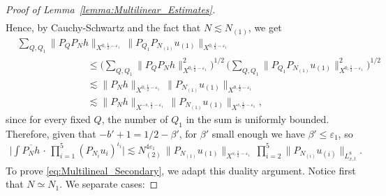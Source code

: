 \documentclass[10pt,a4paper]{amsart}
\begin{document}
\begin{proof}[Proof of Lemma~\ref{lemma:Multilinear_Estimates}]
\begin{align}
    \end{align}
Hence, by Cauchy-Schwartz and the fact that $N \lesssim N_{(1)}$, we get  
    \begin{align}\label{eq:Multilinear_Proof_Box_Localization}
        & \sum_{Q, Q_1} \lVert P_Q P_N  h \rVert_{X^{0, \frac{1}{2} - \varepsilon_1}} \, 
        \big\lVert  P_{Q_1} P_{N_{(1)}} u_{(1)} \big\rVert_{X^{0, \frac{1}{2} - \varepsilon_1}} \nonumber \\
        & \hspace{3cm}
        \leq 
        \Big( \sum_{Q, Q_1 } \lVert P_Q P_N  h \rVert_{X^{0, \frac{1}{2} - \varepsilon_1}}^2
        \Big)^{1/2}
        \, 
        \Big( \sum_{Q, Q_1} \lVert P_{Q_1} P_{N_{(1)}}  u_{(1)} \rVert_{X^{0, \frac{1}{2} - \varepsilon_1}}^2
        \Big)^{1/2} \nonumber \\
        & \hspace{3cm}
        \lesssim 
        \lVert P_N  h \rVert_{X^{0, \frac{1}{2} - \varepsilon_1}} \, 
        \lVert P_{N_{(1)}}  u_{(1)} \rVert_{X^{0, \frac{1}{2} - \varepsilon_1}} \nonumber \\
        & \hspace{3cm}
        \lesssim 
        \lVert P_N  h \rVert_{X^{-s, \frac{1}{2} - \varepsilon_1}} \, 
        \lVert P_{N_{(1)}}  u_{(1)} \rVert_{X^{s, \frac{1}{2} - \varepsilon_1}}, 
    \end{align}
    since for every fixed $Q$, the number of $Q_1$ in the sum is uniformly bounded. 
    Therefore, given that $-b' + 1 = 1/2 - \beta'$, for $\beta'$ small enough we have $\beta' \leq \varepsilon_1$, so
    \begin{align}
        \Big|\int \overline{P_N h} \, \cdot \, \prod_{i=1}^5 
        (P_{N_i} u_i)^{\iota_i} \Big|
        \lesssim
        N_{(2)}^{4\varepsilon_1} \,  
        \lVert P_{N_{(1)}}  u_{(1)} \rVert_{X^{s, \frac{1}{2} - \varepsilon_1}} \, 
        \prod_{i=2}^5 \big\lVert  P_{N_{(i)}} u_{(i)} \big\rVert_{L^8_{x,t}}.
    \end{align}
%
To prove \eqref{eq:Multilineal_Secondary}, we adapt this duality argument. Notice first that $N \simeq N_1$. 
We separate cases:
\hfill \break


\end{proof}
\end{document}
